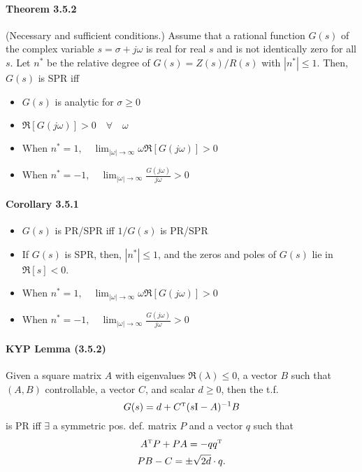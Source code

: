 \paragraph{Theorem 3.5.2}
(Necessary and sufficient conditions.) Assume that a rational function $G(s)$ of the complex variable $s = \sigma + j\omega$ is real for real $s$ and is not identically zero for all $s$. Let $n^*$ be the relative degree of $G(s) = Z(s) / R(s)$ with $|n^*| \leq 1$. Then, $G(s)$ is SPR iff
\begin{itemize}
	\item $G(s)$ is analytic for $\sigma \geq 0$
	\item $\Re[G(j\omega)] > 0 \quad \forall \quad \omega$
	\item When $n^* = 1, \quad \lim_{|\omega| \to \infty} \omega \Re[G(j\omega)] > 0 $
	\item When $n^* = -1,\quad \lim_{|\omega| \to \infty} \frac{G(j\omega)}{j\omega} >0 $
\end{itemize}

\paragraph{Corollary 3.5.1}
\begin{itemize}
	\item $G(s)$ is PR/SPR iff $1/G(s)$ is PR/SPR
	\item If $G(s)$ is SPR, then, $|n^*| \leq 1$, and the zeros and poles of $G(s)$ lie in $\Re[s]<0$.
	\item When $n^* = 1, \quad \lim_{|\omega| \to \infty} \omega \Re[G(j\omega)] > 0 $
	\item When $n^* = -1,\quad \lim_{|\omega| \to \infty} \frac{G(j\omega)}{j\omega} >0 $
\end{itemize}

\paragraph{KYP Lemma (3.5.2)}
Given a square matrix $A$ with eigenvalues $\Re(\lambda) \leq 0$, a vector $B$ such that $(A,B)$ controllable, a vector $C$, and scalar $d \geq 0$, then the t.f.
\begin{equation}
	G(s) = d + C^{\scriptscriptstyle \mathrm{T}} (s \mathrm{I} - A)^{-1} B
\end{equation}
is PR iff $\exists$ a symmetric pos. def. matrix $P$ and a vector $q$ such that
\begin{gather}
	A^{\scriptscriptstyle \mathrm{T}} P + P A = -q q^{\scriptscriptstyle \mathrm{T}} \\
	P B - C = \pm \sqrt{2d} \cdot q
	.
\end{gather}

